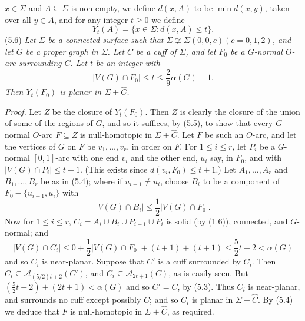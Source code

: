 \noindent $x \in \Sigma$ and $A \subseteq \Sigma$ is non-empty, we define $d(x, A)$ to be $\min d(x, y)$, taken over all $y \in A$, and for any integer $t \ge 0$ we define
\begin{equation*}
Y_t(A) = \{x \in \Sigma : d(x, A) \le t\}.
\end{equation*}
\stmt
(5.6) \textit{Let $\Sigma$ be a connected surface such that $\Sigma \not\cong \Sigma(0, 0, c)(c = 0, 1, 2)$, and let $G$ be a proper graph in $\Sigma$. Let $C$ be a cuff of $\Sigma$, and let $F_0$ be a $G$-normal $O$-arc surrounding $C$. Let $t$ be an integer with}
\begin{equation*}
|V(G) \cap F_0| \le t \le \frac{2}{9}\alpha(G) - 1.
\end{equation*}
\textit{Then $Y_t(F_0)$ is planar in $\Sigma + \hat{C}$.}

\textit{Proof.} Let $Z$ be the closure of $Y_t(F_0)$. Then $Z$ is clearly the closure of the union of some of the regions of $G$, and so it suffices, by (5.5), to show that every $G$-normal $O$-arc $F \subseteq Z$ is null-homotopic in $\Sigma + \hat{C}$. Let $F$ be such an $O$-arc, and let the vertices of $G$ on $F$ be $v_1, \dots, v_r$, in order on $F$. For $1 \le i \le r$, let $P_i$ be a $G$-normal $[0, 1]$-arc with one end $v_i$ and the other end, $u_i$ say, in $F_0$, and with $|V(G) \cap P_i| \le t + 1$. (This exists since $d(v_i, F_0) \le t + 1$.) Let $A_1, \dots, A_r$ and $B_1, \dots, B_r$ be as in (5.4); where if $u_{i-1} \ne u_i$, choose $B_i$ to be a component of $F_0 - \{u_{i-1}, u_i\}$ with
\begin{equation*}
|V(G) \cap B_i| \le \frac{1}{2} |V(G) \cap F_0|.
\end{equation*}
Now for $1 \le i \le r$, $C_i = A_i \cup B_i \cup P_{i-1} \cup P_i$ is solid (by (1.6)), connected, and $G$-normal; and
\begin{equation*}
|V(G) \cap C_i| \le 0 + \frac{1}{2} |V(G) \cap F_0| + (t + 1) + (t + 1) \le \frac{5}{2}t + 2 < \alpha(G)
\end{equation*}
and so $C_i$ is near-planar. Suppose that $C'$ is a cuff surrounded by $C_i$. Then $C_i \subseteq \mathscr{A}_{(5/2)t + 2}(C')$, and $C_i \subseteq \mathscr{A}_{2t+1}(C)$, as is easily seen. But $(\frac{5}{2}t + 2) + (2t + 1) < \alpha(G)$ and so $C' = C$, by (5.3). Thus $C_i$ is near-planar, and surrounds no cuff except possibly $C$; and so $C_i$ is planar in $\Sigma + \hat{C}$. By (5.4) we deduce that $F$ is null-homotopic in $\Sigma + \hat{C}$, as required.

